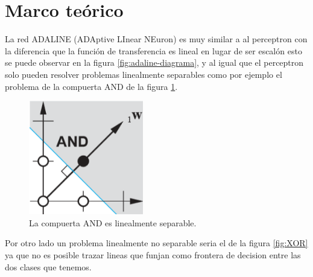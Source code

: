 \documentclass[12pt, titlepage]{article}
\begin{document}
    \section{Marco teórico}
    La red ADALINE (ADAptive LInear NEuron) es muy similar a al perceptron con la diferencia que la función de transferencia es lineal en lugar de ser escalón esto se puede observar en la figura \ref{fig:adaline-diagrama}, y al igual que el perceptron solo pueden resolver problemas linealmente separables como por ejemplo el problema de la compuerta AND de la figura \ref{fig:AND}. \cite{pagina}
    \begin{figure}[H]
        \begin{center}
            \includegraphics[width=5cm]{img/adaline/AND.png}
            \caption{La compuerta AND es linealmente separable. \cite{libro1}}
            \label{fig:AND}
        \end{center}
    \end{figure}
    Por otro lado un problema linealmente no separable seria el de la figura \ref{fig:XOR} ya que no es posible trazar lineas que funjan como frontera de decision entre las dos clases que tenemos.
    
\end{document}
